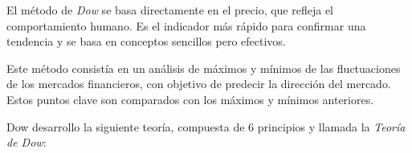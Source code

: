 El método de \textit{Dow} se basa directamente en el precio, que refleja el comportamiento humano. Es el indicador más rápido para confirmar una tendencia y se basa en conceptos sencillos pero efectivos. \newline

Este método consistía en un análisis de máximos y mínimos de las fluctuaciones de los mercados financieros, con objetivo de predecir la dirección del mercado. Estos puntos clave son comparados con los máximos y mínimos anteriores. \newline

Dow desarrollo la siguiente teoría, compuesta de 6 principios y llamada la \textit{Teoría de Dow}: \newline

\begin{enumerate}
	

\end{enumerate}

